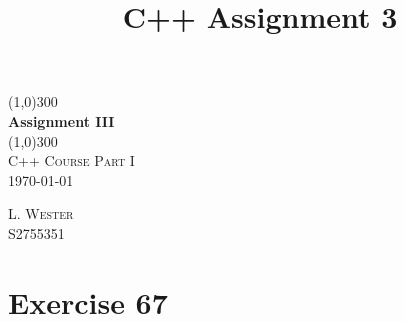 \documentclass{article}
\title{C++ Assignment 3}
\begin{document}
\begin{titlepage}
    \begin{center}
        \line(1,0){300}\\
        [0.65cm]
        \huge{\bfseries Assignment III}\\
        \line(1,0){300}\\
        \textsc{\Large C++ Course Part I}\\
        \textsc{\LARGE \today}\\
        [5.5cm]     
    \end{center}
    \begin{flushright}
        \textsc{\Large L. Wester\\S2755351}\\
        [0.5cm]
    \end{flushright}
\end{titlepage}
\section*{Exercise 67}
\end{document}
